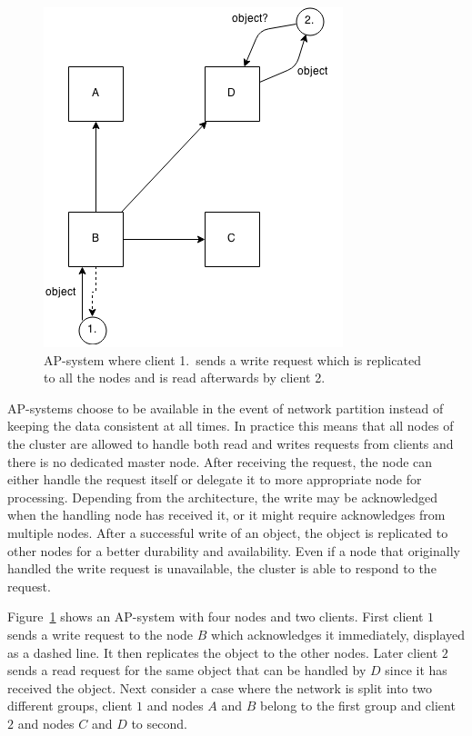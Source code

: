 \begin{figure}[h!]
  \centering
    \includegraphics[scale=0.7]{pictures/ap_system.png}
  \caption{AP-system where client 1.\ sends a write request which is replicated
  to all the nodes and is read afterwards by client 2.}
\label{apimage}
\end{figure}

AP-systems choose to be available in the event of network partition instead of
keeping the data consistent at all times. In practice this means that all nodes
of the cluster are allowed to handle both read and writes requests from clients
and there is no dedicated master node. After receiving the request, the
node can either handle the request itself or delegate it to more appropriate
node for processing. Depending from the architecture, the write may be
acknowledged when the handling node has received it, or it might require
acknowledges from multiple nodes. After a successful write of an object, the
object is replicated to other nodes for a better durability and availability.
Even if a node that originally handled the write request is unavailable, the
cluster is able to respond to the request.

Figure~\ref{apimage} shows an AP-system with four nodes and two clients. First
client \(1\) sends a write request to the node \(B\) which acknowledges it
immediately, displayed as a dashed line. It then replicates the object to the
other nodes. Later client \(2\) sends a read request for the same object that
can be handled by \(D\) since it has received the object. Next consider a case
where the network is split into two different groups, client \(1\) and nodes
\(A\) and \(B\) belong to the first group and client \(2\) and nodes \(C\) and
\(D\) to second.

